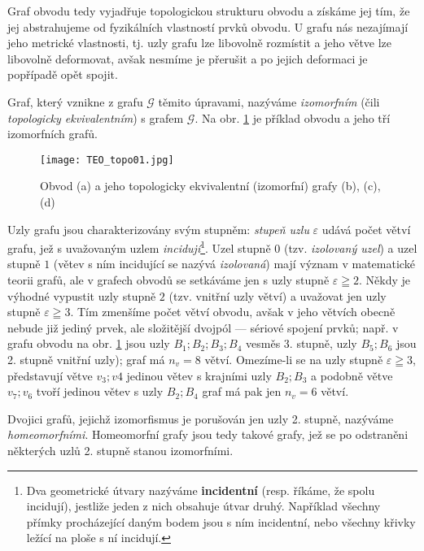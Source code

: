{      Graf obvodu tedy vyjadřuje topologickou strukturu obvodu a získáme jej tím, že jej 
      abstrahujeme od fyzikálních vlastností prvků obvodu. U grafu nás nezajímají jeho metrické 
      vlastnosti, tj. uzly grafu lze libovolně rozmístit a jeho větve lze libovolně deformovat, 
      avšak nesmíme je přerušit a po jejich deformaci je popřípadě opět spojit.
      
      Graf, který vznikne z grafu \(\mathscr{G}\) těmito úpravami, nazýváme \emph{izomorfním} (čili 
      \emph{topologicky ekvivalentním}) s grafem \(\mathscr{G}\). Na obr. \ref{TEO:fig_topo01} je 
      příklad obvodu a jeho tří izomorfních grafů.
      
      \begin{figure}[ht!]
        \centering
        \texttt{[image: TEO\_topo01.jpg]}
        \caption{ Obvod (a) a jeho topologicky ekvivalentní (izomorfní) grafy (b), (c), (d) 
                  \cite[s.~39]{Meyer1978}}
        \label{TEO:fig_topo01}
      \end{figure}
      
      Uzly grafu jsou charakterizovány svým stupněm: \emph{stupeň uzlu} \(\varepsilon\) udává počet 
      větví grafu, jež s uvažovaným uzlem \emph{incidují}\footnote{Dva geometrické útvary nazýváme 
      \textbf{incidentní} (resp. říkáme, že spolu incidují), jestliže jeden z nich obsahuje útvar 
      druhý. Například všechny přímky procházející daným bodem jsou s ním incidentní, nebo všechny 
      křivky ležící na ploše s ní incidují.}. Uzel stupně \(0\) (tzv. \emph{izolovaný uzel}) a uzel 
      stupně \(1\) (větev s ním incidující se nazývá \emph{izolovaná}) mají význam v matematické 
      teorii grafů, ale v grafech obvodů se setkáváme jen s uzly stupně \(\varepsilon\geqq 2\). 
      Někdy je výhodné vypustit uzly stupně \(2\) (tzv. vnitřní uzly větví) a uvažovat jen uzly 
      stupně \(\varepsilon\geqq 3\). Tím zmenšíme počet větví obvodu, avšak v jeho větvích obecně 
      nebude již jediný prvek, ale složitější dvojpól — sériové spojení prvků; např. v grafu obvodu 
      na obr. \ref{TEO:fig_topo01} jsou uzly \(B_1; B_2; B_3; B_4\) vesměs 3. stupně, uzly \(B_5; 
      B_6\) jsou 2. stupně vnitřní uzly); graf má \(n_v = 8\) větví. Omezíme-li se na uzly stupně 
      \(\varepsilon\geqq 3\), představují větve \(v_3; v4\) jedinou větev s krajními uzly \(B_2; 
      B_3\) a podobně větve \(v_7; v_6\) tvoří jedinou větev s uzly \(B_2; B_4\) graf má pak jen 
      \(n_v = 6\) větví.
      
      Dvojici grafů, jejichž izomorfismus je porušován jen uzly 2. stupně, nazýváme 
      \emph{homeomorfními}. Homeomorfní grafy jsou tedy takové grafy, jež se po odstraněni 
      některých uzlů 2. stupně stanou izomorfními.
  
}
